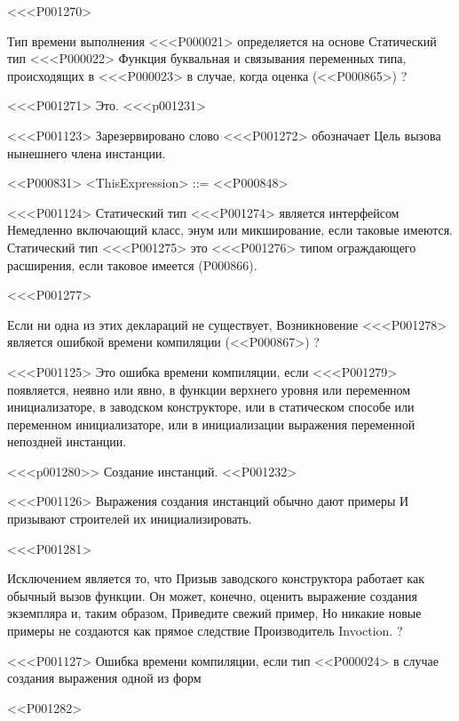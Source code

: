 <<<P001270>{%
Тип времени выполнения <<<P000021> определяется на основе
Статический тип <<<P000022> Функция буквальная
и связывания переменных типа, происходящих в <<<P000023>
в случае, когда оценка
(<<P000865>)%
?


<<<P001271> Это.
<<<p001231>

<<<P001123>%
Зарезервировано слово <<<P001272> обозначает
Цель вызова нынешнего члена инстанции.

<<P000831>
<ThisExpression> ::= \THIS{}
<<P000848>

<<<P001124>%
Статический тип <<<P001274>{} является интерфейсом
Немедленно включающий класс, энум или микширование, если таковые имеются.
Статический тип <<<P001275> это
<<<P001276> типом ограждающего расширения, если таковое имеется
(P000866).

<<<P001277>{%
Если ни одна из этих деклараций не существует,
Возникновение <<<P001278>{} является ошибкой времени компиляции
(<<P000867>)%
?

<<<P001125>%
Это ошибка времени компиляции, если <<<P001279>{} появляется, неявно или явно,
в функции верхнего уровня или переменном инициализаторе, в заводском конструкторе,
или в статическом способе или переменном инициализаторе,
или в инициализации выражения переменной непоздней инстанции.


<<<p001280>> Создание инстанций.
<<P001232>

<<<P001126>%
Выражения создания инстанций обычно дают примеры
И призывают строителей их инициализировать.

<<<P001281>{%
Исключением является то, что
Призыв заводского конструктора работает как обычный вызов функции.
Он может, конечно, оценить выражение создания экземпляра и, таким образом,
Приведите свежий пример,
Но никакие новые примеры не создаются как прямое следствие
Производитель Invoction.%
?

<<<P001127>%
Ошибка времени компиляции, если
тип <<P000024> в случае создания выражения одной из форм

<<P001282>
}}}
